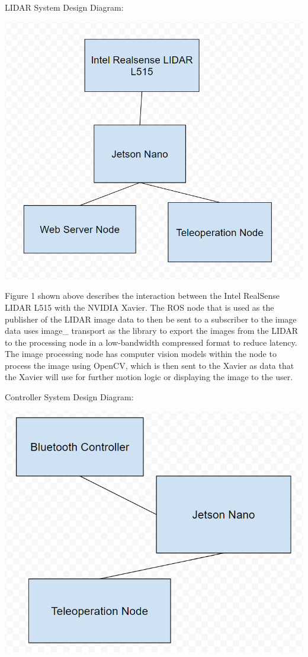\documentclass[a4paper, 10pt]{article}
\begin{document}
LIDAR System Design Diagram:
\begin{center}
\includegraphics[scale=0.5]{LIDAR nodes}
\end{center}

Figure 1 shown above describes the interaction between the Intel RealSense LIDAR L515 with the NVIDIA Xavier. The ROS node that is used as the publisher of the LIDAR image data to then be sent to a subscriber to the image data uses image\_ transport as the library to export the images from the LIDAR to the processing node in a low-bandwidth compressed format to reduce latency. The image processing node has computer vision models within the node to process the image using OpenCV, which is then sent to the Xavier as data that the Xavier will use for further motion logic or displaying the image to the user.

\newpage
Controller System Design Diagram:
\begin{center}
\includegraphics[scale=0.5]{controller node}
\end{center}
\end{document}

